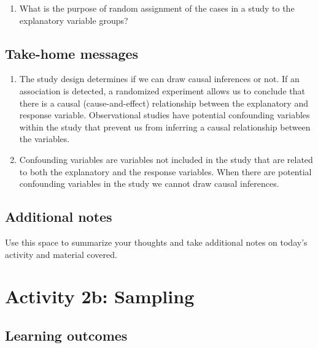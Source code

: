 \documentclass[
]{report}
\providecommand{\tightlist}{%
  \setlength{\itemsep}{0pt}\setlength{\parskip}{0pt}}
\begin{document}
\vspace{1in}

\begin{enumerate}
\def\labelenumi{\arabic{enumi}.}
\setcounter{enumi}{3}
\tightlist
\item
  What is the purpose of random assignment of the cases in a study to the explanatory variable groups?
\end{enumerate}

\vspace{0.8in}

\hypertarget{take-home-messages-2}{%
\subsection{Take-home messages}\label{take-home-messages-2}}

\begin{enumerate}
\def\labelenumi{\arabic{enumi}.}
\item
  The study design determines if we can draw causal inferences or not. If an association is detected, a randomized experiment allows us to conclude that there is a causal (cause-and-effect) relationship between the explanatory and response variable. Observational studies have potential confounding variables within the study that prevent us from inferring a causal relationship between the variables.
\item
  Confounding variables are variables not included in the study that are related to both the explanatory and the response variables. When there are potential confounding variables in the study we cannot draw causal inferences.
\end{enumerate}

\hypertarget{additional-notes-1}{%
\subsection{Additional notes}\label{additional-notes-1}}

Use this space to summarize your thoughts and take additional notes on today's activity and material covered.

\hypertarget{activity-2b-sampling}{%
\section{Activity 2b: Sampling}\label{activity-2b-sampling}}


\hypertarget{learning-outcomes-3}{%
\subsection{Learning outcomes}\label{learning-outcomes-3}}
\end{document}
